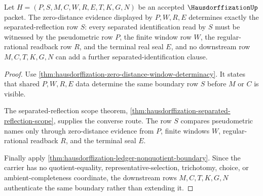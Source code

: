 \begin{theorem}
\label{thm:hausdorffization-zero-distance-exactness}
Let $H=(P,S,M,C,W,R,E,T,K,G,N)$ be an accepted $\HausdorffizationUp$ packet. The zero-distance evidence displayed by $P,W,R,E$ determines exactly the separated-reflection row $S$: every separated identification read by $S$ must be witnessed by the pseudometric row $P$, the finite window row $W$, the regular-rational readback row $R$, and the terminal real seal $E$, and no downstream row $M,C,T,K,G,N$ can add a further separated-identification clause.
\end{theorem}
\begin{proof}
Use \autoref{thm:hausdorffization-zero-distance-window-determinacy}. It states that shared $P,W,R,E$ data determine the same boundary row $S$ before $M$ or $C$ is visible.

The separated-reflection scope theorem, \autoref{thm:hausdorffization-separated-reflection-scope}, supplies the converse route. The row $S$ compares pseudometric names only through zero-distance evidence from $P$, finite windows $W$, regular-rational readback $R$, and the terminal seal $E$.

Finally apply \autoref{thm:hausdorffization-ledger-nonquotient-boundary}. Since the carrier has no quotient-equality, representative-selection, trichotomy, choice, or ambient-completeness coordinate, the downstream rows $M,C,T,K,G,N$ authenticate the same boundary rather than extending it.
\end{proof}

